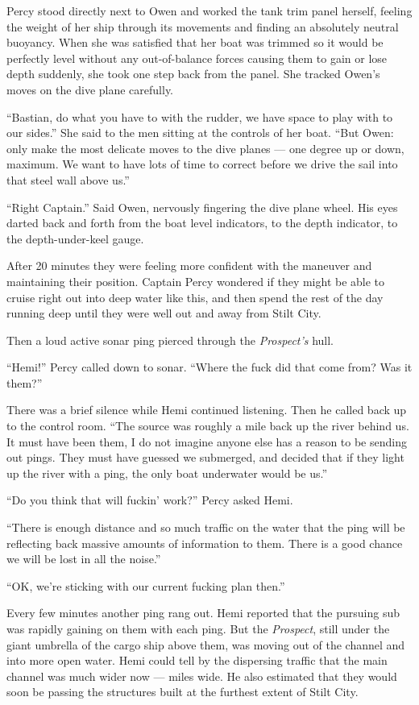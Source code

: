 \documentclass[]{scrbook}
\begin{document}
Percy stood directly next to Owen and worked the tank trim panel
herself, feeling the weight of her ship through its movements and
finding an absolutely neutral buoyancy. When she was satisfied that her
boat was trimmed so it would be perfectly level without any
out-of-balance forces causing them to gain or lose depth suddenly, she
took one step back from the panel. She tracked Owen's moves on the dive
plane carefully.

``Bastian, do what you have to with the rudder, we have space to play
with to our sides.'' She said to the men sitting at the controls of her
boat. ``But Owen: only make the most delicate moves to the dive planes
--- one degree up or down, maximum. We want to have lots of time to
correct before we drive the sail into that steel wall above us.''

``Right Captain.'' Said Owen, nervously fingering the dive plane wheel.
His eyes darted back and forth from the boat level indicators, to the
depth indicator, to the depth-under-keel gauge.

After 20 minutes they were feeling more confident with the maneuver and
maintaining their position. Captain Percy wondered if they might be able
to cruise right out into deep water like this, and then spend the rest
of the day running deep until they were well out and away from Stilt
City.

Then a loud active sonar ping pierced through the \emph{Prospect's}
hull.

``Hemi!'' Percy called down to sonar. ``Where the fuck did that come
from? Was it them?''

There was a brief silence while Hemi continued listening. Then he called
back up to the control room. ``The source was roughly a mile back up the
river behind us. It must have been them, I do not imagine anyone else
has a reason to be sending out pings. They must have guessed we
submerged, and decided that if they light up the river with a ping, the
only boat underwater would be us.''

``Do you think that will fuckin' work?'' Percy asked Hemi.

``There is enough distance and so much traffic on the water that the
ping will be reflecting back massive amounts of information to them.
There is a good chance we will be lost in all the noise.''

``OK, we're sticking with our current fucking plan then.''

Every few minutes another ping rang out. Hemi reported that the pursuing
sub was rapidly gaining on them with each ping. But the \emph{Prospect},
still under the giant umbrella of the cargo ship above them, was moving
out of the channel and into more open water. Hemi could tell by the
dispersing traffic that the main channel was much wider now --- miles
wide. He also estimated that they would soon be passing the structures
built at the furthest extent of Stilt City.
\end{document}
